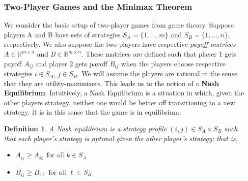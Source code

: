 \documentclass[12pt]{article}
\newcommand{\R}{\mathcal{R}}
\def\R{\mathbb{R}}
\newtheorem{definition}{Definition}
\begin{document}
\subsubsection{Two-Player Games and the Minimax Theorem}
We consider the basic setup of two-player games from game theory. Suppose players A and B have sets of strategies $S_A = \{1, \dots, m\}$ and 
$S_B = \{1, \dots, n\}$, respectively. We also suppose the two players have respective \textit{payoff matrices} $A \in \R^{m \times n}$ and 
$B \in \R^{m \times n}$. These matrices are defined such that player 1 gets payoff $A_{ij}$ and player 2 gets payoff $B_{ij}$ when 
the players choose respective strategies $i \in S_A$, $j \in S_B$. We will assume the players are rational in the sense that they are utility-maximizers. 
This leads us to the notion of a \textbf{Nash Equilibrium}. Intuitively, a Nash Equilibrium is a situation in which, given the other players strategy, neither one
would be better off transitioning to a new strategy. It is in this sense that the game is in equilibrium. 
\begin{definition}
 A Nash equilibrium is a strategy profile $(i, j) \in S_A \times S_B$ such that each player's strategy is optimal given the other player's strategy; that is, 
 \begin{itemize}
 \item $A_{ij} \geq A_{kj} \text{ for all } k \in S_A$ 
 \item $B_{ij} \geq B_{i\ell} \text{ for all } \ell \in S_B$
 \end{itemize}
\end{definition}
\end{document}
